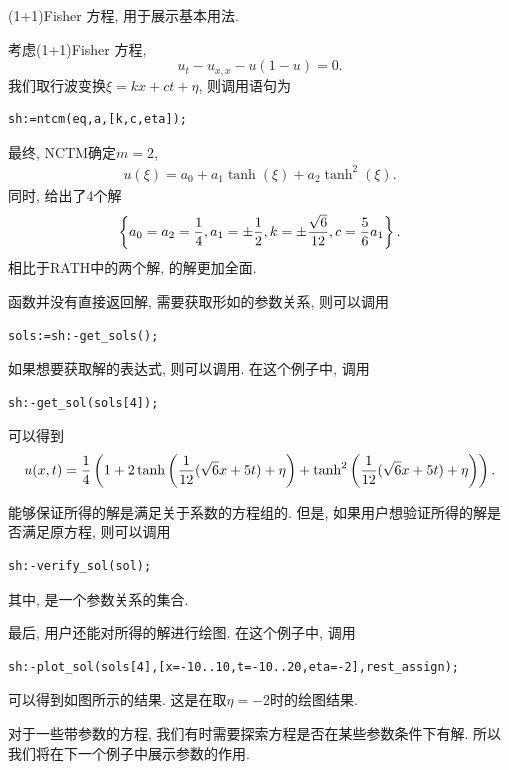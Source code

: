 \begin{example}(1+1)Fisher 方程, 用于展示基本用法.

考虑(1+1)Fisher 方程\cite{guo1991analytic},
\begin{equation}
    u_t-u_{x,x}-u(1-u)=0.
\end{equation}
我们取行波变换$\xi=kx+ct+\eta$, 则调用语句为
\begin{verbatim}
sh:=ntcm(eq,a,[k,c,eta]);
\end{verbatim}
最终, NCTM确定$m=2$,
\begin{eqnarray}
    u(\xi)=a_0+a_1 \tanh(\xi)+a_2\tanh^2(\xi).
\end{eqnarray}
同时, 给出了4个解
\begin{equation}
    \left\{a_0=a_2=\frac{1}{4},a_1=\pm \frac{1}{2},k=\pm \frac{\sqrt 6}{12},c=\frac{5}{6}a_1\right\}. \label{para-rel}
\end{equation}
相比于RATH\cite[p35]{liu2001master}中的两个解, 的解更加全面.


函数并没有直接返回解, 需要获取形如的参数关系, 则可以调用
\begin{verbatim}
sols:=sh:-get_sols();
\end{verbatim}

如果想要获取解的表达式, 则可以调用. 在这个例子中, 调用
\begin{verbatim}
sh:-get_sol(sols[4]);
\end{verbatim}
可以得到
\begin{equation}
    u(x,t)=\frac{1}{4}\left(1+2\tanh\left(\frac{1}{12}(\sqrt{6}x+5t)+\eta\right)+\tanh^2\left(\frac{1}{12}(\sqrt{6}x+5t)+\eta\right)\right). \label{fisher-sol-4}
\end{equation}

能够保证所得的解是满足关于系数的方程组的. 但是, 如果用户想验证所得的解是否满足原方程, 则可以调用
\begin{verbatim}
sh:-verify_sol(sol);
\end{verbatim}
其中, 是一个参数关系的集合.

最后, 用户还能对所得的解进行绘图. 在这个例子中, 调用
\begin{verbatim}
sh:-plot_sol(sols[4],[x=-10..10,t=-10..20,eta=-2],rest_assign);
\end{verbatim}
可以得到如图所示的结果. 这是在取$\eta=-2$时的绘图结果. 
    
\end{example}

对于一些带参数的方程, 我们有时需要探索方程是否在某些参数条件下有解. 所以我们将在下一个例子中展示参数的作用.

